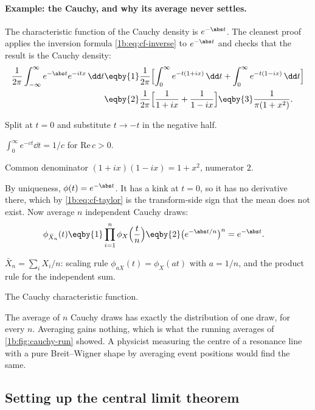\paragraph{Example: the Cauchy, and why its average never settles.}
The characteristic function of the Cauchy density is $e^{-\abs t}$. The
cleanest proof applies the inversion formula \eqref{1b:eq:cf-inverse} to
$e^{-\abs t}$ and checks that the result is the Cauchy density:
\begin{align*}
  \frac1{2\pi}\int_{-\infty}^{\infty}e^{-\abs t}e^{-itx}\,\dd t
  &\eqby{1} \frac1{2\pi}\Bigl[\int_0^\infty e^{-t(1+ix)}\,\dd t+\int_0^\infty e^{-t(1-ix)}\,\dd t\Bigr]\\
  &\eqby{2} \frac1{2\pi}\Bigl[\frac1{1+ix}+\frac1{1-ix}\Bigr]
   \eqby{3} \frac{1}{\pi(1+x^2)} .
\end{align*}
\begin{explain}
  \item Split at $t=0$ and substitute $t\to-t$ in the negative half.
  \item $\int_0^\infty e^{-ct}\dd t=1/c$ for $\mathrm{Re}\,c>0$.
  \item Common denominator $(1+ix)(1-ix)=1+x^2$, numerator $2$.
\end{explain}
By uniqueness, $\phi(t)=e^{-\abs t}$. It has a kink at $t=0$, so it has no
derivative there, which by \eqref{1b:eq:cf-taylor} is the transform-side sign
that the mean does not exist. Now average $n$ independent Cauchy draws:
\begin{align*}
  \phi_{\bar X_n}(t)
  &\eqby{1} \prod_{i=1}^n\phi_X\Bigl(\frac tn\Bigr)
   \eqby{2} \bigl(e^{-\abs t/n}\bigr)^n
   = e^{-\abs t} .
\end{align*}
\begin{explain}
  \item $\bar X_n=\sum_iX_i/n$: scaling rule $\phi_{aX}(t)=\phi_X(at)$ with
        $a=1/n$, and the product rule for the independent sum.
  \item The Cauchy characteristic function.
\end{explain}
The average of $n$ Cauchy draws has exactly the distribution of one draw, for
every $n$. Averaging gains nothing, which is what the running averages of
\cref{1b:fig:cauchy-run} showed. A physicist measuring the centre of a
resonance line with a pure Breit--Wigner shape by averaging event positions
would find the same.

\subsection{Setting up the central limit theorem}

